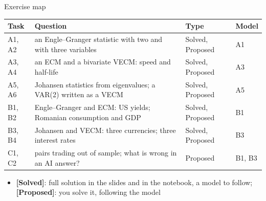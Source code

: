 \begin{frame}{Exercise map}
\itemsize{\small}
\begin{center}
\footnotesize
\begin{tabular}{>{\raggedright\arraybackslash}p{1.1cm}>{\raggedright\arraybackslash}p{7.5cm}>{\raggedright\arraybackslash}p{1.9cm}>{\raggedright\arraybackslash}p{1.4cm}}
\toprule
\textbf{Task} & \textbf{Question} & \textbf{Type} & \textbf{Model} \\
\midrule
A1, A2 & an Engle--Granger statistic with two and with three variables & Solved, Proposed & A1 \\
A3, A4 & an ECM and a bivariate VECM: speed and half-life & Solved, Proposed & A3 \\
A5, A6 & Johansen statistics from eigenvalues; a VAR(2) written as a VECM & Solved, Proposed & A5 \\
B1, B2 & Engle--Granger and ECM: US yields; Romanian consumption and GDP & Solved, Proposed & B1 \\
B3, B4 & Johansen and VECM: three currencies; three interest rates & Solved, Proposed & B3 \\
C1, C2 & pairs trading out of sample; what is wrong in an AI answer? & Proposed & B1, B3 \\
\bottomrule
\end{tabular}
\end{center}
\begin{itemize}
    \item \textbf{[Solved]}: full solution in the slides and in the notebook, a model to follow; \textbf{[Proposed]}: you solve it, following the model
\end{itemize}
\end{frame}

